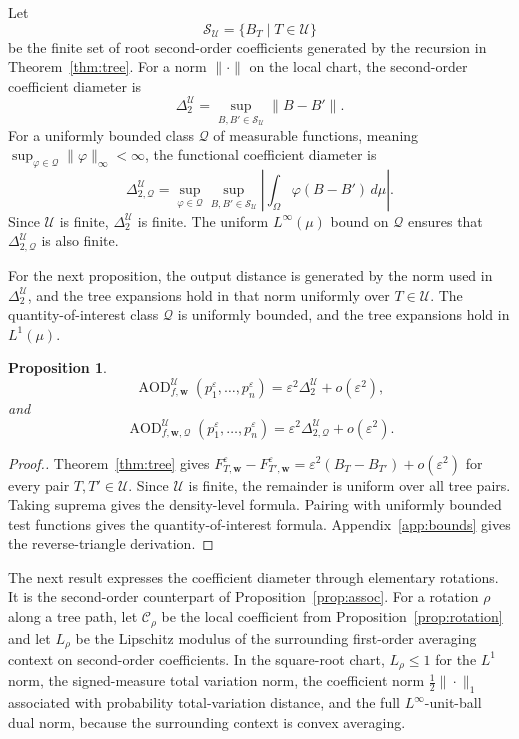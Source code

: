 \documentclass[11pt]{article}
\theoremstyle{plain}
\newtheorem{proposition}[theorem]{Proposition}
\theoremstyle{definition}
\theoremstyle{definition}
\newcommand{\AOD}{\operatorname{AOD}}
\newcommand{\eps}{\varepsilon}
\newcommand{\QoI}{\mathcal Q}
\newcommand{\Curv}{\mathcal C}
\newcommand{\wv}{\mathbf w}
\newcommand{\Fw}[1]{F_{#1,\wv}^{\eps}}
\newcommand{\AODfw}{\AOD_{f,\wv}}
\newcommand{\AODfwQ}{\AOD_{f,\wv,\QoI}}
\begin{document}
Let
\[
\mathcal S_{\mathcal U}=\{B_T \mid T\in\mathcal U\}
\]
be the finite set of root second-order coefficients generated by the recursion in Theorem~\ref{thm:tree}. For a norm $\|\cdot\|$ on the local chart, the second-order coefficient diameter is
\[
\Delta_2^{\mathcal U}=\sup_{B,B'\in\mathcal S_{\mathcal U}}\|B-B'\|.
\]
For a uniformly bounded class $\QoI$ of measurable functions, meaning $\sup_{\varphi\in\QoI}\|\varphi\|_\infty<\infty$, the functional coefficient diameter is
\[
\Delta_{2,\QoI}^{\mathcal U}=\sup_{\varphi\in\QoI}\sup_{B,B'\in\mathcal S_{\mathcal U}}
\left|\int_\Omega \varphi(B-B')\,d\mu\right|.
\]
Since $\mathcal U$ is finite, $\Delta_2^{\mathcal U}$ is finite. The uniform $L^\infty(\mu)$ bound on $\QoI$ ensures that $\Delta_{2,\QoI}^{\mathcal U}$ is also finite.

For the next proposition, the output distance is generated by the norm used in $\Delta_2^{\mathcal U}$, and the tree expansions hold in that norm uniformly over $T\in\mathcal U$. The quantity-of-interest class $\QoI$ is uniformly bounded, and the tree expansions hold in $L^1(\mu)$.

\begin{proposition}\label{prop:diameter-asymptotic}
\[
\AODfw^{\mathcal U}(p_1^\eps,\ldots,p_n^\eps)=\eps^2\Delta_2^{\mathcal U}+o(\eps^2),
\]
and
\[
\AODfwQ^{\mathcal U}(p_1^\eps,\ldots,p_n^\eps)=\eps^2\Delta_{2,\QoI}^{\mathcal U}+o(\eps^2).
\]
\end{proposition}

\begin{proof}[Proof.]
Theorem~\ref{thm:tree} gives $\Fw{T}-\Fw{T'}=\eps^2(B_T-B_{T'})+o(\eps^2)$ for every pair $T,T'\in\mathcal U$. Since $\mathcal U$ is finite, the remainder is uniform over all tree pairs. Taking suprema gives the density-level formula. Pairing with uniformly bounded test functions gives the quantity-of-interest formula. Appendix~\ref{app:bounds} gives the reverse-triangle derivation.
\end{proof}

The next result expresses the coefficient diameter through elementary rotations. It is the second-order counterpart of Proposition~\ref{prop:assoc}. For a rotation $\rho$ along a tree path, let $\Curv_\rho$ be the local coefficient from Proposition~\ref{prop:rotation} and let $L_\rho$ be the Lipschitz modulus of the surrounding first-order averaging context on second-order coefficients. In the square-root chart, $L_\rho\le1$ for the $L^1$ norm, the signed-measure total variation norm, the coefficient norm $\frac12\|\cdot\|_1$ associated with probability total-variation distance, and the full $L^\infty$-unit-ball dual norm, because the surrounding context is convex averaging.
\end{document}
